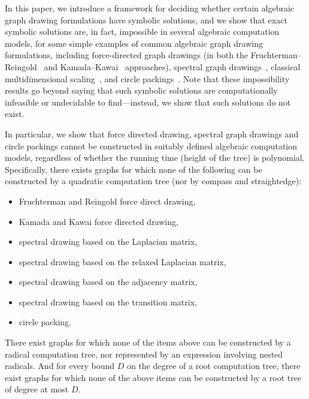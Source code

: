 \documentclass[oribibl,10pt]{llncs}
\begin{document}
In this paper, we introduce a framework for deciding whether certain 
algebraic graph drawing formulations have symbolic solutions, and we show that
exact symbolic solutions are, in fact, impossible in several 
algebraic computation models, for some simple examples
of common algebraic graph drawing formulations, including 
force-directed graph
drawings (in both the Fruchterman--Reingold~\cite{FruRei-SPE-1991} and 
Kamada--Kawai~\cite{KamKaw-IPL-1989} approaches), 
spectral graph drawings~\cite{Kor-CMA-2005}, classical multidimensional scaling~\cite{KruSee-CSG-80}, and 
circle packings~\cite{Koe-BSAWL-36}.
Note that these impossibility 
results go beyond saying that such symbolic solutions are
computationally infeasible or undecidable to find---instead, 
we show that such solutions do not exist.

\ifFull
In particular,
we show that force directed drawing, spectral graph drawings and circle
packings cannot be constructed in suitably defined algebraic computation models, regardless of whether the running time (height of the tree) is polynomial. Specifically, there exists graphs for 
which none of the following 
can be constructed by a quadratic computation tree (nor by compass and straightedge):
\begin{itemize}
\item Fruchterman and Reingold force direct drawing,
\item Kamada and Kawai force directed drawing,
\item spectral drawing based on the Laplacian matrix,
\item spectral drawing based on the relaxed Laplacian matrix,
\item spectral drawing based on the adjacency matrix,
\item spectral drawing based on the transition matrix,
\item circle packing.
\end{itemize}
There exist graphs for which none of the items above can be constructed by a radical computation tree, nor represented by an expression involving nested radicals. And for every bound $D$ on the degree of a root computation tree, there exist graphs for which none of the above items can be constructed by a root tree of degree at most $D$.
\fi
\end{document}

